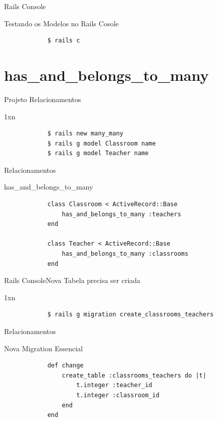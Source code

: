 \documentclass{beamer}
\begin{document}
\begin{frame}[fragile]{Rails Console}
	\begin{block} {\LARGE Testando os Modelos no Rails Cosole}
		\begin{verbatim}
			$ rails c
		\end{verbatim}
	\end{block}
\end{frame}

\section{has\_and\_belongs\_to\_many}

\begin{frame}[fragile]{Projeto Relacionamentos}
	\begin{block} {1xn}
		\begin{verbatim}
		  	$ rails new many_many
		  	$ rails g model Classroom name 
		  	$ rails g model Teacher name
		\end{verbatim}
	\end{block}
\end{frame}

\begin{frame}[fragile]{Relacionamentos}
	\begin{block} {\LARGE has\_and\_belongs\_to\_many}
		\begin{verbatim}
		  	class Classroom < ActiveRecord::Base
		  	    has_and_belongs_to_many :teachers
		  	end
		  	
		  	class Teacher < ActiveRecord::Base
		  	    has_and_belongs_to_many :classrooms
		  	end
		\end{verbatim}
	\end{block}
\end{frame}

\begin{frame}[fragile]{Rails Console}{Nova Tabela precisa ser criada}
	\begin{block} {1xn}
		\begin{verbatim}
		  	$ rails g migration create_classrooms_teachers
		\end{verbatim}
	\end{block}
\end{frame}

\begin{frame}[fragile]{Relacionamentos}
	\begin{block} {\LARGE Nova Migration Essencial}
		\begin{verbatim}
		    def change
		        create_table :classrooms_teachers do |t|
		            t.integer :teacher_id
		            t.integer :classroom_id			
		        end
		    end
		\end{verbatim}
	\end{block}
\end{frame}
\end{document}
